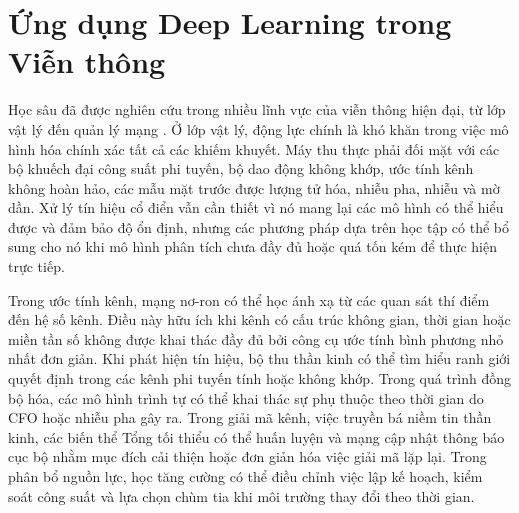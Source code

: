 \section{Ứng dụng Deep Learning trong Viễn thông}
Học sâu đã được nghiên cứu trong nhiều lĩnh vực của viễn thông hiện đại, từ lớp vật lý đến quản lý mạng \cite{oshea2017,cammerer2020}. Ở lớp vật lý, động lực chính là khó khăn trong việc mô hình hóa chính xác tất cả các khiếm khuyết. Máy thu thực phải đối mặt với các bộ khuếch đại công suất phi tuyến, bộ dao động không khớp, ước tính kênh không hoàn hảo, các mẫu mặt trước được lượng tử hóa, nhiễu pha, nhiễu và mờ dần. Xử lý tín hiệu cổ điển vẫn cần thiết vì nó mang lại các mô hình có thể hiểu được và đảm bảo độ ổn định, nhưng các phương pháp dựa trên học tập có thể bổ sung cho nó khi mô hình phân tích chưa đầy đủ hoặc quá tốn kém để thực hiện trực tiếp.

Trong ước tính kênh, mạng nơ-ron có thể học ánh xạ từ các quan sát thí điểm đến hệ số kênh. Điều này hữu ích khi kênh có cấu trúc không gian, thời gian hoặc miền tần số không được khai thác đầy đủ bởi công cụ ước tính bình phương nhỏ nhất đơn giản. Khi phát hiện tín hiệu, bộ thu thần kinh có thể tìm hiểu ranh giới quyết định trong các kênh phi tuyến tính hoặc không khớp. Trong quá trình đồng bộ hóa, các mô hình trình tự có thể khai thác sự phụ thuộc theo thời gian do CFO hoặc nhiễu pha gây ra. Trong giải mã kênh, việc truyền bá niềm tin thần kinh, các biến thể Tổng tối thiểu có thể huấn luyện và mạng cập nhật thông báo cục bộ nhằm mục đích cải thiện hoặc đơn giản hóa việc giải mã lặp lại. Trong phân bổ nguồn lực, học tăng cường có thể điều chỉnh việc lập kế hoạch, kiểm soát công suất và lựa chọn chùm tia khi môi trường thay đổi theo thời gian.

